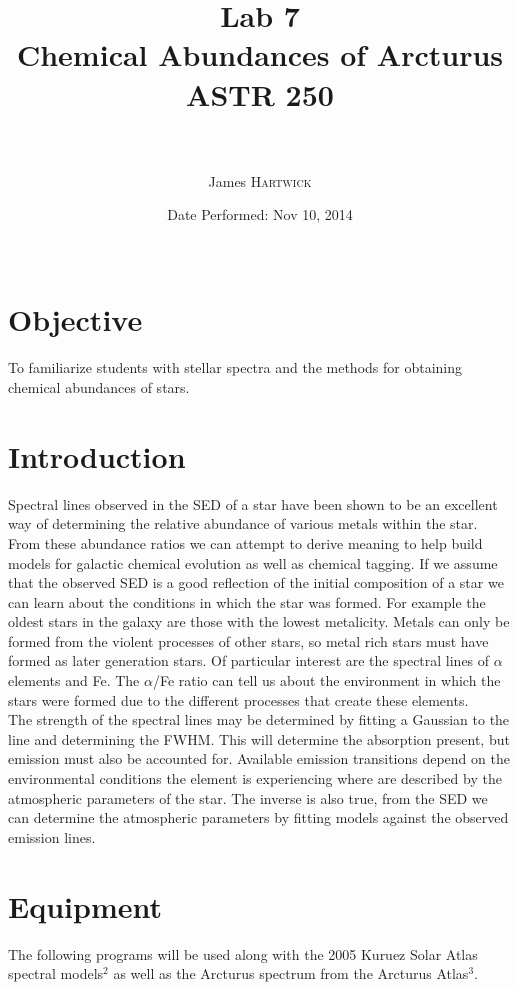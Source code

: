 \documentclass{article}
\title{Lab 7 \\ Chemical Abundances of Arcturus \\ ASTR 250\\ \ \\ } %
\author{James \textsc{Hartwick}} %
\date{Date Performed: Nov 10, 2014\\ \ } %
\begin{document}
\maketitle %


\section{Objective}
To familiarize students with stellar spectra and the methods for obtaining chemical abundances of stars.
\section{Introduction}
Spectral lines observed in the SED of a star have been shown to be an excellent way of determining the relative abundance of various metals within the star. From these abundance ratios we can attempt to derive meaning to help build models for galactic chemical evolution as well as chemical tagging. If we assume that the observed SED is a good reflection of the initial composition of a star we can learn about the conditions in which the star was formed. For example the oldest stars in the galaxy are those with the lowest metalicity. Metals can only be formed from the violent processes of other stars, so metal rich stars must have formed as later generation stars. Of particular interest are the spectral lines of $\alpha$ elements and Fe. The $\alpha$/Fe ratio can tell us about the environment in which the stars were formed due to the different processes that create these elements.\\

The strength of the spectral lines may be determined by fitting a Gaussian to the line and determining the FWHM. This will determine the absorption present, but emission must also be accounted for. Available emission transitions depend on the environmental conditions the element is experiencing where are described by the atmospheric parameters of the star. The inverse is also true, from the SED we can determine the atmospheric parameters by fitting models against the observed emission lines. 
\section{Equipment}
The following programs will be used along with the 2005 Kuruez Solar Atlas spectral models$^2$ as well as the Arcturus spectrum from the Arcturus Atlas$^3$.\\
\end{document}
